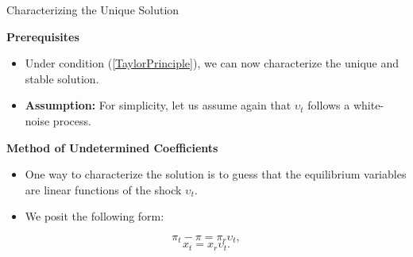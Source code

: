 \documentclass[11pt,aspectratio=169]{beamer}
\begin{document}
\begin{frame}{Characterizing the Unique Solution}
\small

\textbf{Prerequisites}
\begin{itemize}
    \item Under condition (\ref{TaylorPrinciple}), we can now characterize the unique and stable solution.
    \item \textbf{Assumption:} For simplicity, let us assume again that $\upsilon _{t}$ follows a white-noise process.
\end{itemize}

\textbf{Method of Undetermined Coefficients}
\begin{itemize}
    \item One way to characterize the solution is to guess that the equilibrium variables are linear functions of the shock $\upsilon _{t}$.
    \item We posit the following form:
\end{itemize}

\begin{equation*}
\pi _{t}-\pi =\pi _{r}\upsilon _{t},
\end{equation*}
\begin{equation*}
x_{t}=x_{r}\upsilon _{t}.
\end{equation*}
\end{frame}
\end{document}
